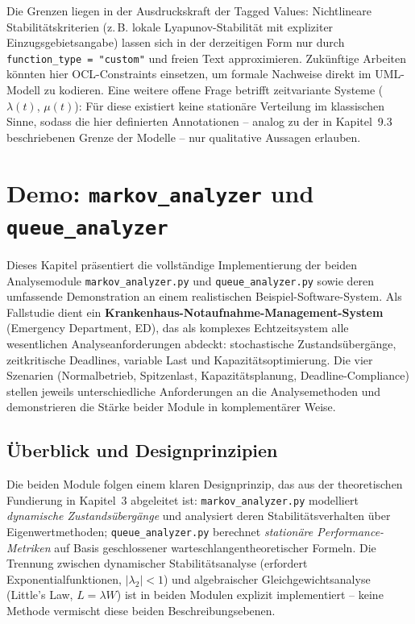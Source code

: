 ﻿\documentclass[a4paper,12pt]{report}
\theoremstyle{definition}
\begin{document}
Die Grenzen liegen in der Ausdruckskraft der Tagged Values: Nichtlineare
Stabilitätskriterien (z.\,B. lokale Lyapunov-Stabilität mit expliziter
Einzugsgebietsangabe) lassen sich in der derzeitigen Form nur durch
\texttt{function\_type = "custom"} und freien Text approximieren. Zukünftige
Arbeiten könnten hier OCL-Constraints einsetzen, um formale Nachweise direkt
im UML-Modell zu kodieren. Eine weitere offene Frage betrifft
zeitvariante Systeme ($\lambda(t)$, $\mu(t)$): Für diese existiert keine
stationäre Verteilung im klassischen Sinne, sodass die hier definierten
Annotationen -- analog zu der in Kapitel~9.3 beschriebenen Grenze der
Modelle -- nur qualitative Aussagen erlauben.

\section{Demo: \texttt{markov\_analyzer} und \texttt{queue\_analyzer}}
\label{sec:demo}

Dieses Kapitel präsentiert die vollständige Implementierung der beiden
Analysemodule \texttt{markov\_analyzer.py} und \texttt{queue\_analyzer.py}
sowie deren umfassende Demonstration an einem realistischen Beispiel-Software-System.
Als Fallstudie dient ein \textbf{Krankenhaus-Notaufnahme-Management-System}
(Emergency Department, ED), das als komplexes Echtzeitsystem alle wesentlichen
Analyseanforderungen abdeckt: stochastische Zustandsübergänge, zeitkritische
Deadlines, variable Last und Kapazitätsoptimierung. Die vier Szenarien
(Normalbetrieb, Spitzenlast, Kapazitätsplanung, Deadline-Compliance) stellen
jeweils unterschiedliche Anforderungen an die Analysemethoden und demonstrieren
die Stärke beider Module in komplementärer Weise.

\subsection{Überblick und Designprinzipien}

Die beiden Module folgen einem klaren Designprinzip, das aus der
theoretischen Fundierung in Kapitel~3 abgeleitet ist:
\texttt{markov\_analyzer.py} modelliert \emph{dynamische Zustandsübergänge}
und analysiert deren Stabilitätsverhalten über Eigenwertmethoden;
\texttt{queue\_analy\newline zer.py} berechnet \emph{stationäre Performance-Metriken}
auf Basis geschlossener warteschlangentheoretischer Formeln.
Die Trennung zwischen dynamischer Stabilitätsanalyse
(erfordert Exponentialfunktionen, $|\lambda_2| < 1$) und algebraischer
Gleichgewichtsanalyse (Little's Law, $L = \lambda W$) ist in beiden Modulen
explizit implementiert -- keine Methode vermischt diese beiden Beschreibungsebenen.
\end{document}
